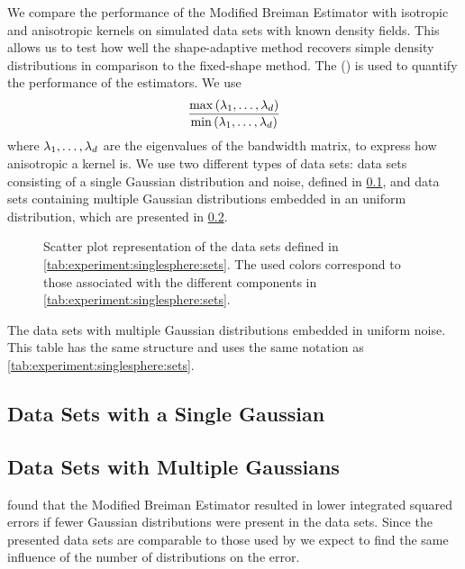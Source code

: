 We compare the performance of the Modified Breiman Estimator with isotropic and anisotropic kernels on simulated data sets with known density fields. This allows us to test how well the shape-adaptive method recovers simple density distributions in comparison to the fixed-shape method. 
The \mse (\MSE) is used to quantify the performance of the estimators. We use
\begin{equation*}\label{eq:experiment:anisotropicmetric}
	\frac{\max\left(\lambda_1, \dotsc, \lambda_d \right)}{\min\left(\lambda_1, \dotsc, \lambda_d \right)}
\end{equation*}
where $\lambda_1, \dotsc, \lambda_d$ are the eigenvalues of the bandwidth matrix, to express how anisotropic a kernel is.
We use two different types of data sets: data sets consisting of a single Gaussian distribution and noise, defined in \cref{s:experiment:singlesphere},  and data sets containing multiple Gaussian distributions embedded in an uniform distribution, which are presented in \cref{s:experiment:multisphere}.

\begin{figure*}
	\centering
	
	\caption{Scatter plot representation of the data sets defined in \cref{tab:experiment:singlesphere:sets}. The used colors correspond to those associated with the different components in \cref{tab:experiment:singlesphere:sets}.}
	\label{fig:experiment:singlesphere:sets}
\end{figure*}

\begin{table*}
	\centering
	
	\caption{The data sets with multiple Gaussian distributions embedded in uniform noise. This table has the same structure and uses the same notation as \cref{tab:experiment:singlesphere:sets}.} 	
	\label{tab:experiment:multisphere:sets}
\end{table*}

\subsection{Data Sets with a Single Gaussian}
\label{s:experiment:singlesphere}


\subsection{Data Sets with Multiple Gaussians}
\label{s:experiment:multisphere}


\textcite{ferdosi2011comparison} found that the Modified Breiman Estimator resulted in lower integrated squared errors if fewer Gaussian distributions were present in the data sets. Since the presented data sets are comparable to those used by \citeauthor{ferdosi2011comparison} we expect to find the same influence of the number of distributions on the error.
